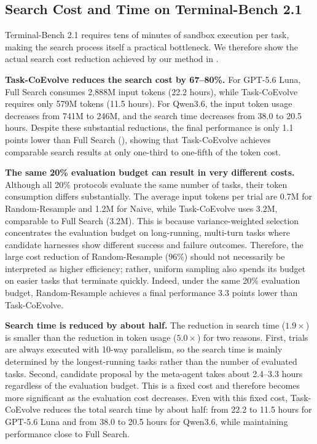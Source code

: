 \documentclass{article} %
\begin{document}
\subsection{Search Cost and Time on Terminal-Bench 2.1}
\label{subsec:tb2-cost}

Terminal-Bench 2.1 requires tens of minutes of sandbox execution per task, making the search process itself a practical bottleneck. We therefore show the actual search cost reduction achieved by our method in .

\textbf{Task-CoEvolve reduces the search cost by 67--80\%.}
For GPT-5.6 Luna, Full Search consumes 2{,}888M input tokens (22.2 hours), while Task-CoEvolve requires only 579M tokens (11.5 hours). For Qwen3.6, the input token usage decreases from 741M to 246M, and the search time decreases from 38.0 to 20.5 hours. Despite these substantial reductions, the final performance is only 1.1 points lower than Full Search (), showing that Task-CoEvolve achieves comparable search results at only one-third to one-fifth of the token cost.

\textbf{The same 20\% evaluation budget can result in very different costs.}
Although all 20\% protocols evaluate the same number of tasks, their token consumption differs substantially. The average input tokens per trial are 0.7M for Random-Resample and 1.2M for Naive, while Task-CoEvolve uses 3.2M, comparable to Full Search (3.2M). This is because variance-weighted selection concentrates the evaluation budget on long-running, multi-turn tasks where candidate harnesses show different success and failure outcomes. Therefore, the large cost reduction of Random-Resample (96\%) should not necessarily be interpreted as higher efficiency; rather, uniform sampling also spends its budget on easier tasks that terminate quickly. Indeed, under the same 20\% evaluation budget, Random-Resample achieves a final performance 3.3 points lower than Task-CoEvolve.

\textbf{Search time is reduced by about half.}
The reduction in search time ($1.9\times$) is smaller than the reduction in token usage ($5.0\times$) for two reasons. First, trials are always executed with 10-way parallelism, so the search time is mainly determined by the longest-running tasks rather than the number of evaluated tasks. Second, candidate proposal by the meta-agent takes about 2.4--3.3 hours regardless of the evaluation budget. This is a fixed cost and therefore becomes more significant as the evaluation cost decreases. Even with this fixed cost, Task-CoEvolve reduces the total search time by about half: from 22.2 to 11.5 hours for GPT-5.6 Luna and from 38.0 to 20.5 hours for Qwen3.6, while maintaining performance close to Full Search.
\end{document}
